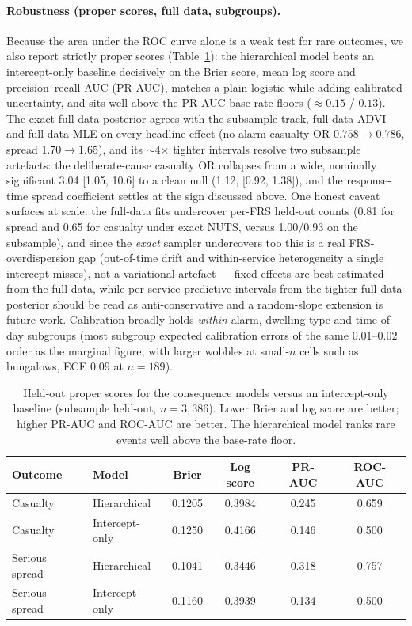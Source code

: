 \paragraph{Robustness (proper scores, full data, subgroups).}
Because the area under the ROC curve alone is a weak test for rare outcomes, we also
report strictly proper scores (Table~\ref{tab:proper}): the hierarchical model beats an
intercept-only baseline decisively on the Brier score, mean log score and
precision--recall AUC (PR-AUC), matches a plain logistic while adding calibrated
uncertainty, and sits well above the PR-AUC base-rate floors ($\approx0.15$ / $0.13$).
The exact full-data posterior agrees with the subsample track, full-data ADVI and
full-data MLE on every headline effect (no-alarm casualty OR $0.758\to0.786$,
spread $1.70\to1.65$), and its $\sim$4$\times$ tighter intervals resolve two
subsample artefacts: the deliberate-cause casualty OR collapses from a wide,
nominally significant 3.04 [1.05, 10.6] to a clean null (1.12, [0.92, 1.38]), and
the response-time spread coefficient settles at the sign discussed above. One
honest caveat surfaces at scale: the full-data fits undercover per-FRS held-out
counts (0.81 for spread and 0.65 for casualty under exact NUTS, versus 1.00/0.93
on the subsample), and since the \emph{exact} sampler undercovers too this is a
real FRS-overdispersion gap (out-of-time drift and within-service heterogeneity a
single intercept misses), not a variational artefact --- fixed effects are best
estimated from the full data, while per-service predictive intervals from the
tighter full-data posterior should be read as anti-conservative and a
random-slope extension is future work. Calibration broadly holds \emph{within} alarm,
dwelling-type and time-of-day subgroups (most subgroup expected calibration errors of
the same $0.01$--$0.02$ order as the marginal figure, with larger wobbles at
small-$n$ cells such as bungalows, ECE $0.09$ at $n{=}189$).

\begin{table}[htbp]
  \centering
  \caption{Held-out proper scores for the consequence models versus an intercept-only
  baseline (subsample held-out, $n=3{,}386$). Lower Brier and log score are better;
  higher PR-AUC and ROC-AUC are better. The hierarchical model ranks rare events well
  above the base-rate floor.}
  \label{tab:proper}
  \small
  \begin{tabular}{@{}llcccc@{}}
    \toprule
    Outcome & Model & Brier & Log score & PR-AUC & ROC-AUC \\
    \midrule
    Casualty       & Hierarchical    & 0.1205 & 0.3984 & 0.245 & 0.659 \\
    Casualty       & Intercept-only  & 0.1250 & 0.4166 & 0.146 & 0.500 \\
    Serious spread & Hierarchical    & 0.1041 & 0.3446 & 0.318 & 0.757 \\
    Serious spread & Intercept-only  & 0.1160 & 0.3939 & 0.134 & 0.500 \\
    \bottomrule
  \end{tabular}
\end{table}

